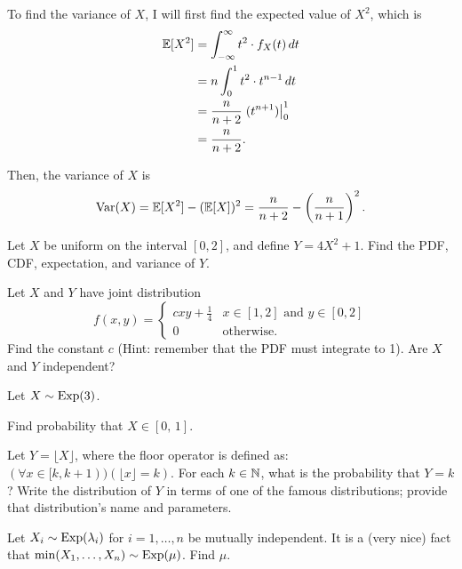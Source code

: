 \documentclass[11pt]{article}
\begin{document}
\begin{solution}
\begin{Parts}
\Part To find the variance of $X$, I will first find the expected value of 
$X^2$, which is
\[
    \begin{split}
        \operatorname{\mathbb{E}}[X^2] &= \int_{-\infty}^{\infty} t^2 \cdot f_X(t) \, dt \\
        &= n \int_{0}^{1} t^2 \cdot t^{n-1}  \, dt \\
        &= \frac{n}{n+2} \left. (t^{n+1}) \right|_0^1 \\
        &= \frac{n}{n+2}.
    \end{split}
\]

Then, the variance of $X$ is
\[
    \operatorname{Var}(X) = \operatorname{\mathbb{E}}[X^2] - (\operatorname{\mathbb{E}}[X])^2 = \frac{n}{n+2} - \left( \frac{n}{n+1} \right)^2.
\]

\end{Parts}

\end{solution}


\begin{Parts}
    \Part Let $X$ be uniform on the interval $[0,2]$, and define $Y = 4X^2 + 1$. 
    Find the PDF, CDF, expectation, and variance of $Y$.

    \Part Let $X$ and $Y$ have joint distribution 
    \[
        f(x,y) = \begin{cases}
            c x y + \frac{1}{4} & \text{$x \in [1,2]$ and $y \in [0,2]$} \\
            0 & \text{otherwise.}
        \end{cases}
    \]
    Find the constant $c$ (Hint: remember that the PDF must integrate to 1). Are 
    $X$ and $Y$ independent?

    \Part Let $X \sim \operatorname{Exp}(3)$. 
    \begin{Parts}
    	\item Find probability that $X \in [0, \,1]$.
    	\item Let $Y = \lfloor X \rfloor$, where the floor operator is defined 
        as:  $(\forall x \in [k, k+1))(\lfloor x \rfloor = k)$. For each $k \in 
        \mathbb{N}$, what is the probability that $Y = k$? Write the distribution of $Y$ 
        in terms of one of the famous distributions; provide that distribution's 
        name and parameters.
    \end{Parts}

    \Part Let $X_i \sim \operatorname{Exp}(\lambda_i)$ for $i = 1,\ldots,n$ be mutually 
    independent. It is a (very nice) fact that $\min(X_1,\ldots,X_n) \sim 
    \operatorname{Exp}(\mu)$. Find $\mu$.
\end{Parts}
\end{document}
